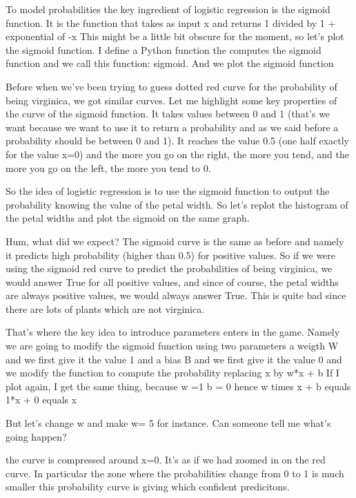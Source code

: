 \documentclass{article}
\begin{document}
To model probabilities the key ingredient of logistic regression is the sigmoid function.
It is the function that takes as input x and returns 1 divided by 1 + exponential of -x
This might be a little bit obscure for the moment, 
so let's  plot the sigmoid function.
I define a Python function the computes the sigmoid function and we call this function: 
sigmoid.
And we plot the sigmoid function

Before when we've been trying to guess dotted red curve for the probability of being virginica, we got similar curves.
Let me highlight some key properties of the curve of the sigmoid function. 
It takes values between 0 and 1 
(that's we want because we want to use it to return a probability and as 
we said before a probability should be between 0 and 1).
It reaches the value 0.5 (one half exactly for the value x=0) 
and the more you go on the right, the more you tend, 
and the more you go on the left, the more you tend to 0.

So the idea of logistic regression is to use the sigmoid function to output the probability knowing the value of the petal width.
So let's replot the histogram of the petal widths and plot the sigmoid on the same graph.

Hum, what did we expect?  The sigmoid curve is the same as before and namely it predicts high probability (higher than 0.5) for positive values. 
So if we were using the sigmoid red curve to predict the probabilities of being virginica,
we would answer True for all positive values, and since of course,
the petal widths are always positive values, we would always answer True. 
This is quite bad since there are lots of plants which are not virginica.

That's where the key idea to introduce parameters enters in the game.
Namely we are going to modify the sigmoid function using two parameters
a weigth W and  we first give it the value 1
and a bias B and we first give it the value 0
and we modify the function to compute the probability replacing x by w*x + b
If I plot again, I get the same thing, because w =1 b = 0 hence w times x + b 
equals 1*x + 0 equals x

But let's change w and make w= 5 for instance. 
Can someone tell me what's going happen?

the curve is compressed around x=0.
It's as if we had zoomed in on the red curve.
In particular the zone where the probabilities change from 0 to 1 is much smaller
this probability curve is giving which confident predicitons.
\end{document}
